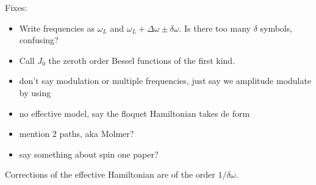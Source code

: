 Fixes:
\begin{itemize}
	\item Write frequencies as $\omega_L$ and $\omega_L +\Delta\omega \pm\delta\omega$. Is there too many $\delta$ symbols, confusing?
	\item Call $J_0$ the zeroth order Bessel functions of the first kind.
	\item don't say modulation or multiple frequencies, just say we amplitude modulate by using 
	\item no effective model, say the floquet Hamiltonian takes de form
	\item mention 2 paths, aka Molmer?
	\item say something about spin one paper?
\end{itemize}




Corrections of the effective Hamiltonian are of the order $1/\delta\omega$.
